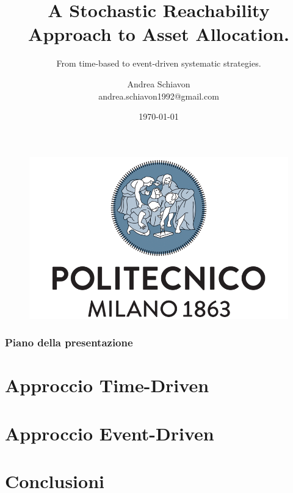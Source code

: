 \documentclass[11pt]{beamer}
\title[] %
{\huge A Stochastic Reachability Approach to Asset Allocation.}
\subtitle{\Large From time-based to event-driven systematic strategies.}
\author[] %
{Andrea Schiavon\\
	andrea.schiavon1992@gmail.com}
\date[]{\today} %
\begin{document}
\begin{frame}[plain]
	\begin{figure}[htpb]
		\centering
		\includegraphics[width=0.4\linewidth]{Images/polimi_name}
	\end{figure}
	\titlepage
\end{frame}



	
	
\begin{frame}{}
	\frametitle{Piano della presentazione}
	\tableofcontents
\end{frame}	

	
\section{Approccio Time-Driven}

\section{Approccio Event-Driven}


\section{Conclusioni}

	
	
	
	
	
	
	
	
\end{document}
